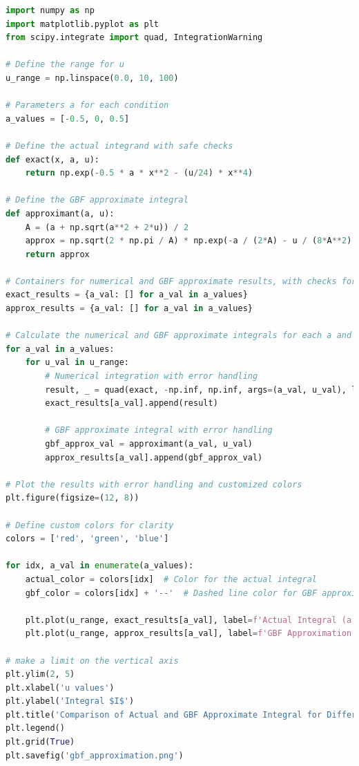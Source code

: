 \documentclass[12pt]{article}
\begin{document}
\begin{lstlisting}[language=Python]
import numpy as np
import matplotlib.pyplot as plt
from scipy.integrate import quad, IntegrationWarning

# Define the range for u
u_range = np.linspace(0.0, 10, 100)

# Parameters a for each condition
a_values = [-0.5, 0, 0.5]

# Define the actual integrand with safe checks
def exact(x, a, u):
    return np.exp(-0.5 * a * x**2 - (u/24) * x**4)

# Define the GBF approximate integral
def approximant(a, u):
    A = (a + np.sqrt(a**2 + 2*u)) / 2
    approx = np.sqrt(2 * np.pi / A) * np.exp(-a / (2*A) - u / (8*A**2) + 1/2)
    return approx

# Containers for numerical and GBF approximate results, with checks for safe computation
exact_results = {a_val: [] for a_val in a_values}
approx_results = {a_val: [] for a_val in a_values}

# Calculate the numerical and GBF approximate integrals for each a and range of u
for a_val in a_values:
    for u_val in u_range:
        # Numerical integration with error handling
        result, _ = quad(exact, -np.inf, np.inf, args=(a_val, u_val), limit=100)
        exact_results[a_val].append(result)

        # GBF approximate integral with error handling
        gbf_approx_val = approximant(a_val, u_val)
        approx_results[a_val].append(gbf_approx_val)

# Plot the results with error handling and customized colors
plt.figure(figsize=(12, 8))

# Define custom colors for clarity
colors = ['red', 'green', 'blue']

for idx, a_val in enumerate(a_values):
    actual_color = colors[idx]  # Color for the actual integral
    gbf_color = colors[idx] + '--'  # Dashed line color for GBF approximation

    plt.plot(u_range, exact_results[a_val], label=f'Actual Integral (a = {a_val})', color=actual_color, linestyle='-', marker='')
    plt.plot(u_range, approx_results[a_val], label=f'GBF Approximation (a = {a_val})', color=actual_color, linestyle='--', marker='')

# make a limit on the vertical axis
plt.ylim(2, 5)
plt.xlabel('u values')
plt.ylabel('Integral $I$')
plt.title('Comparison of Actual and GBF Approximate Integral for Different a Values (with customized colors)')
plt.legend()
plt.grid(True)
plt.savefig('gbf_approximation.png')

\end{lstlisting}
\end{document}
